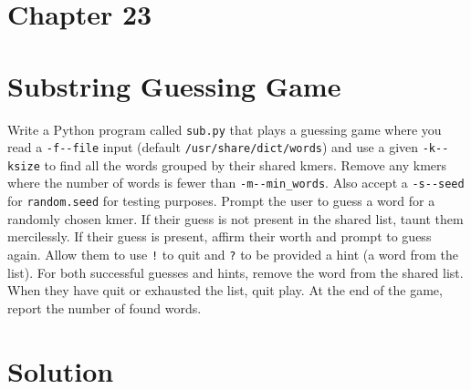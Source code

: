 \documentclass[]{article}
\begin{document}
\pagebreak

\hypertarget{chapter-23}{%
\section{Chapter 23}\label{chapter-23}}

\hypertarget{substring-guessing-game}{%
\section{Substring Guessing Game}\label{substring-guessing-game}}

Write a Python program called \texttt{sub.py} that plays a guessing game
where you read a \texttt{-f\textbar{}-\/-file} input (default
\texttt{/usr/share/dict/words}) and use a given
\texttt{-k\textbar{}-\/-ksize} to find all the words grouped by their
shared kmers. Remove any kmers where the number of words is fewer than
\texttt{-m\textbar{}-\/-min\_words}. Also accept a
\texttt{-s\textbar{}-\/-seed} for \texttt{random.seed} for testing
purposes. Prompt the user to guess a word for a randomly chosen kmer. If
their guess is not present in the shared list, taunt them mercilessly.
If their guess is present, affirm their worth and prompt to guess again.
Allow them to use \texttt{!} to quit and \texttt{?} to be provided a
hint (a word from the list). For both successful guesses and hints,
remove the word from the shared list. When they have quit or exhausted
the list, quit play. At the end of the game, report the number of found
words.

\pagebreak

\hypertarget{solution-18}{%
\section{Solution}\label{solution-18}}
\end{document}
